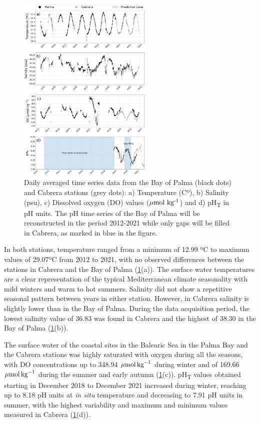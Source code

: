 \begin{figure}[H]
    \centering
    \includegraphics[width=0.57\textwidth]{Figures/Data_study.pdf}
    \caption[Daily averaged time series data from the Bay of Palma and Cabrera
        stations]{Daily averaged time series data from the Bay of Palma (black
        dots)
        and Cabrera stations (grey dots): a) Temperature (Cº), b) Salinity
        (psu), c) Dissolved oxygen (DO) values (${\mu\textrm{mol
                        kg}\textsuperscript{-1}}$) and d) pH\textsubscript{T}
        in pH units. The pH time series of the Bay of Palma will be
        reconstructed in the period 2012-2021 while only gaps will be filled in
        Cabrera, as marked in blue in the figure.}
    \label{fig:data}
\end{figure}

In both stations, temperature ranged from a minimum of 12.99 ºC to maximum
values of 29.07ºC from 2012 to 2021, with no observed differences between the
stations in Cabrera and the Bay of Palma (\cref{fig:data}(a)). The surface
water temperatures are a clear representation of the typical Mediterranean
climate seasonality with mild winters and warm to hot summers. Salinity did not
show a repetitive seasonal pattern between years in either station. However,
in Cabrera salinity is slightly lower than in the Bay of Palma. During the data
acquisition period, the lowest salinity value of 36.83 was found in Cabrera and
the highest of 38.30 in the Bay of Palma (\cref{fig:data}(b)).

The surface water of the coastal sites in the Balearic Sea in the Palma Bay
and the Cabrera stations was highly saturated with oxygen during all the
seasons, with DO concentrations up to  348.94 ${\mu \textrm{mol\,kg}^{-1}}$
during winter and of 169.66 ${\mu \textrm{mol\,kg}^{-1}}$ during the summer and
early autumn (\cref{fig:data}(c)). pH\textsubscript{T} values obtained starting
in December 2018 to December 2021 increased during winter, reaching up to 8.18
pH units at \emph{in situ} temperature and decreasing to 7.91 pH units in
summer, with the highest variability and maximum and minimum values measured in
Cabrera (\cref{fig:data}(d)).

